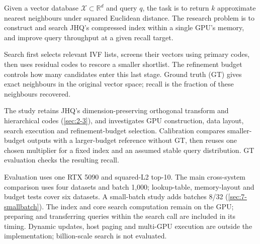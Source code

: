 Given a vector database $\mathcal X\subset\mathbb R^d$ and query $q$,
the task is to return $k$ approximate nearest neighbours under squared
Euclidean distance. The research problem is to construct and search
JHQ's compressed index within a single GPU's memory, and improve query
throughput at a given recall target.

Search first selects relevant IVF lists, screens their vectors using
primary codes, then uses residual codes to rescore a smaller shortlist.
The refinement budget controls how many candidates enter this last stage.
Ground truth (GT) gives exact neighbours in the original vector space;
recall is the fraction of these neighbours recovered.

The study retains JHQ's dimension-preserving orthogonal transform and
hierarchical codes (\cref{sec:2-3}), and investigates GPU construction,
data layout, search execution and refinement-budget selection.
Calibration compares smaller-budget outputs with a larger-budget
reference without GT, then reuses one chosen multiplier for a fixed
index and an assumed stable query distribution. GT evaluation checks
the resulting recall.

Evaluation uses one RTX 5090 and squared-L2 top-10. The main cross-system
comparison uses four datasets and batch 1,000; lookup-table, memory-layout
and budget tests cover six datasets. A small-batch study adds batches
8/32 (\cref{sec:7-smallbatch}). The index and core search computation
remain on the GPU; preparing and transferring queries within the search
call are included in its timing. Dynamic updates, host paging and
multi-GPU execution are outside the implementation; billion-scale
search is not evaluated.
